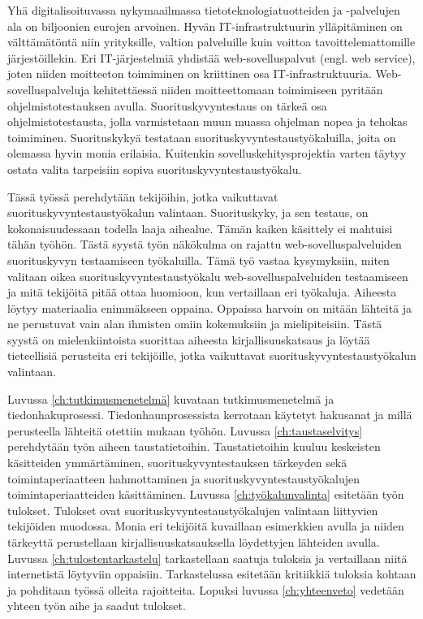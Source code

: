Yhä digitalisoituvassa nykymaailmassa tietoteknologiatuotteiden ja -palvelujen ala on biljoonien eurojen arvoinen. Hyvän IT-infrastruktuurin ylläpitäminen on välttämätöntä niin yrityksille, valtion palveluille kuin voittoa tavoittelemattomille järjestöillekin. \parencite{ITbudgets} Eri IT-järjestelmiä yhdistää web-sovelluspalvut (engl. web service), joten niiden moitteeton toimiminen on kriittinen osa IT-infrastruktuuria. Web-sovelluspalveluja kehitettäessä niiden moitteettomaan toimimiseen pyritään ohjelmistotestauksen avulla. Suorituskyvyntestaus on tärkeä osa ohjelmistotestausta, jolla varmistetaan muun muassa ohjelman nopea ja tehokas toimiminen. Suorituskykyä testataan suorituskyvyntestaustyökaluilla, joita on olemassa hyvin monia erilaisia. Kuitenkin sovelluskehitysprojektia varten täytyy ostata valita tarpeisiin sopiva suorituskyvyntestaustyökalu. 

Tässä työssä perehdytään tekijöihin, jotka vaikuttavat suorituskyvyntestaustyökalun valintaan. Suorituskyky, ja sen testaus, on kokonaisuudessaan todella laaja aihealue. Tämän kaiken käsittely ei mahtuisi tähän työhön. Tästä syystä työn näkökulma on rajattu web-sovelluspalveluiden suorituskyvyn testaamiseen työkaluilla. Tämä työ vastaa kysymyksiin, miten valitaan oikea suorituskyvyntestaustyökalu web-sovelluspalveluiden testaamiseen ja mitä tekijöitä pitää ottaa huomioon, kun vertaillaan eri työkaluja. Aiheesta löytyy materiaalia enimmäkseen oppaina. Oppaissa harvoin on mitään lähteitä ja ne perustuvat vain alan ihmisten omiin kokemuksiin ja mielipiteisiin. Tästä syystä on mielenkiintoista suorittaa aiheesta kirjallisuuskatsaus ja löytää tieteellisiä perusteita eri tekijöille, jotka vaikuttavat suorituskyvyntestaustyökalun valintaan.

Luvussa \ref{ch:tutkimusmenetelmä} kuvataan tutkimusmenetelmä ja tiedonhakuprosessi. Tiedonhaunprosessista kerrotaan käytetyt hakusanat ja millä perusteella lähteitä otettiin mukaan työhön. Luvussa \ref{ch:taustaselvitys} perehdytään työn aiheen taustatietoihin. Taustatietoihin kuuluu keskeisten käsitteiden ymmärtäminen, suorituskyvyntestauksen tärkeyden sekä toimintaperiaatteen hahmottaminen ja suorituskyvyntestaustyökalujen toimintaperiaatteiden käsittäminen. Luvussa \ref{ch:työkalunvalinta} esitetään työn tulokset. Tulokset ovat suorituskyvyntestaustyökalujen valintaan liittyvien tekijöiden muodossa. Monia eri tekijöitä kuvaillaan esimerkkien avulla ja niiden tärkeyttä perustellaan kirjallisuuskatsauksella löydettyjen lähteiden avulla. Luvussa \ref{ch:tulostentarkastelu} tarkastellaan saatuja tuloksia ja vertaillaan niitä internetistä löytyviin oppaisiin. Tarkastelussa esitetään kritiikkiä tuloksia kohtaan ja pohditaan työssä olleita rajoitteita. Lopuksi luvussa \ref{ch:yhteenveto} vedetään yhteen työn aihe ja saadut tulokset.
